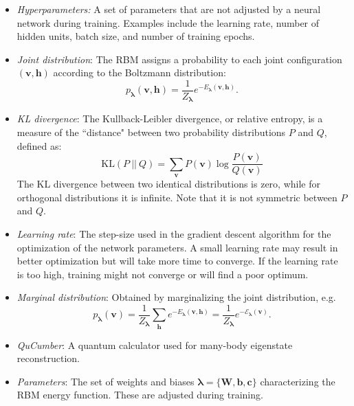 \documentclass[submission, Phys, hidelnks]{SciPost}
\begin{document}
\begin{itemize}
\item{\it Hyperparameters:} A set of parameters that are not adjusted by a neural network during training. Examples include the learning rate, number of hidden units, batch size, and number of training epochs.

\item {\it Joint distribution}: The RBM assigns a probability to each joint configuration $(\bm v, \bm h)$ according to the Boltzmann distribution:
\begin{equation}
   p_{\bm{\lambda}}(\bm{v},\bm{h}) = \frac{1}{Z_{\bm{\lambda}}} e^{-E_{\bm{\lambda}}(\bm{v},\bm{h})}.
\end{equation}

\item{\it KL divergence}: The Kullback-Leibler divergence, or relative entropy, is a measure of the ``distance" between two probability distributions $P$ and $Q$, defined as:
\begin{equation}
\mathrm{KL}(P\:||\:Q)=\sum_{\bm{v}}P(\bm{v})\log\frac{P(\bm{v})}{Q(\bm{v})}
\end{equation}
The KL divergence between two identical distributions is zero, while for orthogonal distributions it is infinite.
Note that it is not symmetric between $P$ and $Q$.

\item{\it Learning rate}: The step-size used in the gradient descent algorithm for the optimization of the network parameters. A small learning rate may result in better optimization but will take more time to converge. If the learning rate is too high, training might not converge or will find a poor optimum.

\item {\it Marginal distribution}: Obtained by marginalizing the joint distribution, e.g.
\begin{equation}\label{Eq:marginal_distribution}
   p_{\bm{\lambda}}(\bm{v}) = \frac{1}{Z_{\bm{\lambda}}} \sum_{\bm{h}} e^{-E_{\bm{\lambda}}(\bm{v},\bm{h})} = \frac{1}{Z_{\bm{\lambda}}} e^{- \mathcal{E}_{\bm{\lambda}}(\bm{v})}.
\end{equation}

\item {\it QuCumber}: A quantum calculator used for many-body eigenstate reconstruction.

\item {\it Parameters}: The set of weights and biases $\bm{\lambda} = \{\bm{W},\bm{b},\bm{c}\}$ characterizing the RBM energy function. These are adjusted during training.


\end{itemize}
\end{document}
